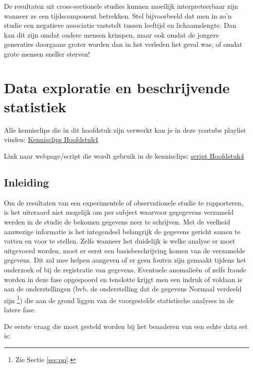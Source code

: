 \documentclass[
  12pt,dutch,coursenotes]{book}
\theoremstyle{definition}
\theoremstyle{definition}
\theoremstyle{definition}
\theoremstyle{definition}
\theoremstyle{remark}
\begin{document}
De resultaten uit cross-sectionele studies kunnen moeilijk interpreteerbaar zijn wanneer ze een tijdscomponent betrekken. Stel bijvoorbeeld dat men in zo'n studie een negatieve associatie
vaststelt tussen leeftijd en lichaamslengte. Dan kan dit zijn omdat oudere
mensen krimpen, maar ook omdat de jongere generaties doorgaans groter worden
dan in het verleden het geval was, of omdat grote mensen sneller sterven!

\hypertarget{chap-describe}{%
\chapter{Data exploratie en beschrijvende statistiek}\label{chap-describe}}

Alle kennisclips die in dit hoofdstuk zijn verwerkt kan je in deze youtube playlist vinden: \href{https://www.youtube.com/watch?v=AVd-8WE_DhU\&list=PLZH1hP8_LbJLKTeg_D9CHC3xbk0nfBa-1}{Kennisclips Hoofdstuk4}

Link naar webpage/script die wordt gebruik in de kennisclips: \href{https://statomics.github.io/sbc21/rmd/04-dataExploration.html}{script Hoofdstuk4}

\hypertarget{inleiding-3}{%
\section{Inleiding}\label{inleiding-3}}

Om de resultaten van een experimentele of observationele studie te
rapporteren, is het uiteraard niet mogelijk om per subject waarvoor gegegevens verzameld werden in de studie de bekomen gegevens neer te schrijven. Met
de veelheid aanwezige informatie is het integendeel belangrijk de gegevens
gericht samen te vatten en voor te stellen. Zelfs wanneer het duidelijk is welke analyse er moet uitgevoerd worden, moet er eerst een
basisbeschrijving komen van de verzamelde gegevens. Dit zal mee helpen
aangeven of er geen fouten zijn gemaakt tijdens het onderzoek of bij de
registratie van gegevens. Eventuele anomalieën of zelfs fraude worden in
deze fase opgespoord en tenslotte krijgt men een indruk of voldaan is aan de
onderstellingen (bvb. de onderstelling dat de gegevens Normaal verdeeld zijn
\footnote{Zie Sectie \ref{sec:qq}.}) die aan de grond liggen van de voorgestelde
statistische analyses in de latere fase.

De eerste vraag die moet gesteld worden bij het benaderen van een echte data
set is:
\end{document}
